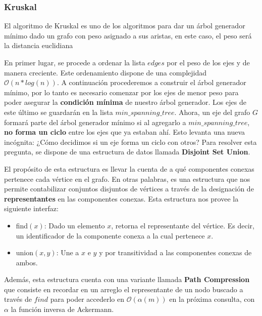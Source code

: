 \subsubsection{Kruskal}
El algoritmo de Kruskal es uno de los algoritmos para dar un árbol generador mínimo dado un grafo con peso asignado a sus aristas, en este caso, el peso será la distancia euclidiana

En primer lugar, se procede a ordenar la lista $edges$ por el peso de los ejes y de manera creciente. Este ordenamiento dispone de una complejidad $\mathcal{O}(n * log(n))$. A continuación procederemos a construir el árbol generador mínimo, por lo tanto es necesario comenzar por los ejes de menor peso para poder asegurar la \textbf{condición mínima} de nuestro árbol generador. Los ejes de este último se guardarán en la lista $min\_spanning\_tree$. Ahora, un eje del grafo $G$ formará parte del árbol generador mínimo si al agregarlo a $min\_spanning\_tree$, \textbf{no forma un ciclo} entre los ejes que ya estaban ahí. Esto levanta una nueva incógnita: ¿Cómo decidimos si un eje forma un ciclo con otros? Para resolver esta pregunta, se dispone de una estructura de datos llamada \textbf{Disjoint Set Union}.

El propósito de esta estructura es llevar la cuenta de a qué componentes conexas pertenece cada vértice en el grafo. En otras palabras, es una estructura que nos permite contabilizar conjuntos disjuntos de vértices a través de la designación de \textbf{representantes} en las componentes conexas. Esta estructura nos provee la siguiente interfaz:
\begin{itemize}
	\item find$(x)$: Dado un elemento $x$, retorna el representante del vértice. Es decir, un identificador de la componente conexa a la cual pertenece $x$.
 	\item union$(x, y)$: Une a $x$ e $y$ y por transitividad a las componentes conexas de ambos.
\end{itemize}

Además, esta estructura cuenta con una variante llamada \textbf{Path Compression} que consiste en recordar en un arreglo el representante de un nodo buscado a través de $find$ para poder accederlo en $\mathcal{O}(\alpha(m))$ en la próxima consulta, con $\alpha$ la función inversa de Ackermann.